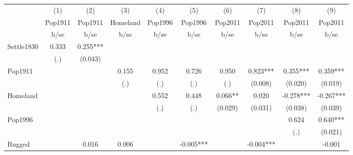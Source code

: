 {
\def\sym#1{\ifmmode^{#1}\else\(^{#1}\)\fi}
\begin{tabular}{l*{9}{c}}
\hline\hline
                    &\multicolumn{1}{c}{(1)}&\multicolumn{1}{c}{(2)}&\multicolumn{1}{c}{(3)}&\multicolumn{1}{c}{(4)}&\multicolumn{1}{c}{(5)}&\multicolumn{1}{c}{(6)}&\multicolumn{1}{c}{(7)}&\multicolumn{1}{c}{(8)}&\multicolumn{1}{c}{(9)}\\
                    &\multicolumn{1}{c}{Pop1911}&\multicolumn{1}{c}{Pop1911}&\multicolumn{1}{c}{Homeland}&\multicolumn{1}{c}{Pop1996}&\multicolumn{1}{c}{Pop1996}&\multicolumn{1}{c}{Pop2011}&\multicolumn{1}{c}{Pop2011}&\multicolumn{1}{c}{Pop2011}&\multicolumn{1}{c}{Pop2011}\\
                    &        b/se   &        b/se   &        b/se   &        b/se   &        b/se   &        b/se   &        b/se   &        b/se   &        b/se   \\
\hline
Settle1830          &       0.333   &       0.255***&               &               &               &               &               &               &               \\
                    &         (.)   &     (0.043)   &               &               &               &               &               &               &               \\
Pop1911             &               &               &       0.155   &       0.952   &       0.726   &       0.950   &       0.823***&       0.355***&       0.359***\\
                    &               &               &         (.)   &         (.)   &         (.)   &         (.)   &     (0.008)   &     (0.020)   &     (0.019)   \\
Homeland            &               &               &               &       0.552   &       0.448   &       0.066** &       0.020   &      -0.278***&      -0.267***\\
                    &               &               &               &         (.)   &         (.)   &     (0.029)   &     (0.031)   &     (0.038)   &     (0.039)   \\
Pop1996             &               &               &               &               &               &               &               &       0.624   &       0.640***\\
                    &               &               &               &               &               &               &               &         (.)   &     (0.021)   \\
Rugged              &               &       0.016   &       0.006   &               &      -0.005***&               &      -0.004***&               &      -0.001   \\

\end{tabular}}
